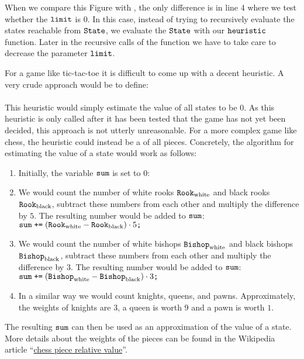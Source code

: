 When we compare this Figure with , the only difference is in line 4
where we test whether the $\texttt{limit}$ is $0$.  In this case, instead of trying to recursively evaluate the
states reachable from $\texttt{State}$, we evaluate the $\texttt{State}$ with our $\texttt{heuristic}$ function.
Later in the recursive calls of the function  we have to take care to decrease the parameter
$\texttt{limit}$.

For a game like tic-tac-toe it is difficult to come up with a decent heuristic.  A very crude approach would be
to define:
\\[0.2cm]
\hspace*{1.3cm}
\\[0.2cm]
This heuristic would simply estimate the value of all states to be $0$.  As this heuristic is only called after
it has been tested that the game has not yet been decided, this approach is not utterly unreasonable.  For a more
complex game like chess, the heuristic could instead be a  of all pieces.  Concretely, the
algorithm for estimating the value of a state would work as follows:
\begin{enumerate}
\item Initially, the variable $\texttt{sum}$ is set to $0$:
      \\[0.2cm]
      \hspace*{1.3cm}
\item We would count the number of white rooks $\texttt{Rook}_{\mathrm{white}}$ and black rooks $\texttt{Rook}_{\mathrm{black}}$,
      subtract these numbers from each other and multiply the difference by $5$.  
      The resulting number would be added to $\texttt{sum}$:
      \\[0.2cm]
      \hspace*{1.3cm}
      $\texttt{sum} \;\texttt{+=}\; (\texttt{Rook}_{\mathrm{white}} - \texttt{Rook}_{\mathrm{black}}) \cdot 5\texttt{;}$
\item We would count the number of white bishops $\texttt{Bishop}_{\mathrm{white}}$ and black bishops
      $\texttt{Bishop}_{\mathrm{black}}$,
      subtract these numbers from each other and multiply the difference by $3$.  
      The resulting number would be added to $\texttt{sum}$:
      \\[0.2cm]
      \hspace*{1.3cm}
      $\texttt{sum} \;\texttt{+=}\; (\texttt{Bishop}_{\mathrm{white}} - \texttt{Bishop}_{\mathrm{black}}) \cdot 3\texttt{;}$
\item In a similar way we would count knights, queens, and pawns.  Approximately, the weights of
      knights are $3$, a queen is worth $9$ and a pawn is worth $1$.
\end{enumerate}
The resulting $\texttt{sum}$ can then be used as an approximation of the value of a state.
More details about the weights of the pieces can be found in the Wikipedia article 
``\href{https://en.wikipedia.org/wiki/Chess_piece_relative_value}{chess piece relative value}''.


